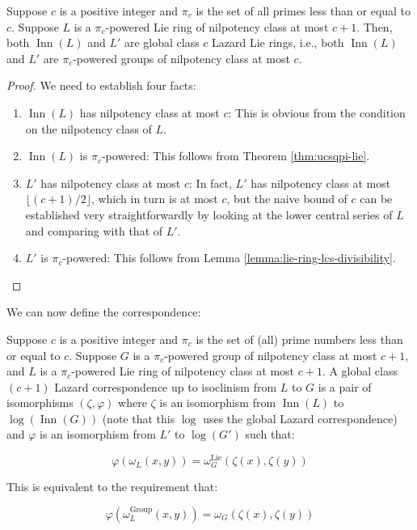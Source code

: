 \begin{lemma}
  Suppose $c$ is a positive integer and $\pi_c$ is the set of all primes
  less than or equal to $c$. Suppose $L$ is a $\pi_c$-powered Lie ring of
  nilpotency class at most $c + 1$. Then, both $\operatorname{Inn}(L)$
  and $L'$ are global class $c$ Lazard Lie rings, i.e., both
  $\operatorname{Inn}(L)$ and $L'$ are $\pi_c$-powered groups of
  nilpotency class at most $c$.
\end{lemma}

\begin{proof}
  We need to establish four facts:

  \begin{enumerate}
  \item $\operatorname{Inn}(L)$ has nilpotency class at most $c$: This
    is obvious from the condition on the nilpotency class of $L$.
  \item $\operatorname{Inn}(L)$ is $\pi_c$-powered: This follows from
    Theorem \ref{thm:ucsqpi-lie}.
  \item $L'$ has nilpotency class at most $c$: In fact, $L'$ has
    nilpotency class at most $\lfloor (c + 1)/2 \rfloor$, which in
    turn is at most $c$, but the naive bound of $c$ can be established
    very straightforwardly by looking at the lower central series of
    $L$ and comparing with that of $L'$. %
  \item $L'$ is $\pi_c$-powered: This follows from Lemma
    \ref{lemma:lie-ring-lcs-divisibility}.
  \end{enumerate}
\end{proof}

We can now define the correspondence:

\begin{definer}
  Suppose $c$ is a positive integer and $\pi_c$ is the set of (all)
  prime numbers less than or equal to $c$. Suppose $G$ is a
  $\pi_c$-powered group of nilpotency class at most $c + 1$, and $L$ is
  a $\pi_c$-powered Lie ring of nilpotency class at most $c + 1$. A
  global class $(c + 1)$ Lazard correspondence up to isoclinism from $L$ to
  $G$ is a pair of isomorphisms $(\zeta,\varphi)$ where $\zeta$ is an
  isomorphism from $\operatorname{Inn}(L)$ to
  $\log(\operatorname{Inn}(G))$ (note that this $\log$ uses the global
  Lazard correspondence) and $\varphi$ is an isomorphism from $L'$ to
  $\log(G')$ such that:

  $$\varphi(\omega_L(x,y)) = \omega^{\text{Lie}}_G(\zeta(x),\zeta(y))$$

  This is equivalent to the requirement that:

  $$\varphi(\omega^{\text{Group}}_L(x,y)) = \omega_G(\zeta(x),\zeta(y))$$
\end{definer}

